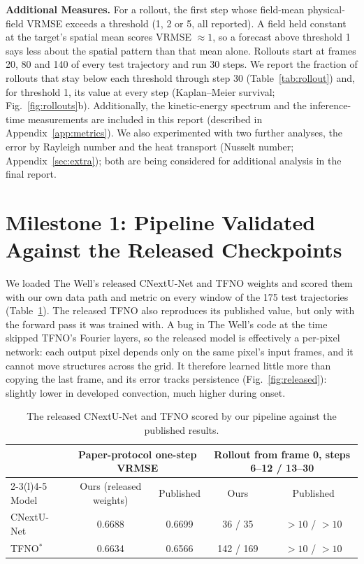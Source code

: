 \documentclass[11pt]{article}
\begin{document}
\textbf{Additional Measures.} For a rollout, the first step whose field-mean physical-field VRMSE exceeds a threshold
(1, 2 or 5, all reported). A field held constant at the target's spatial mean scores VRMSE $\approx 1$, so a
forecast above threshold 1 says less about the spatial pattern than that mean alone. Rollouts start at frames 20,
80 and 140 of every test trajectory and run 30 steps. We
report the fraction of rollouts that stay below each threshold through step 30 (Table~\ref{tab:rollout}) and,
for threshold 1, its value at every step (Kaplan--Meier survival; Fig.~\ref{fig:rollouts}b). Additionally, the kinetic-energy spectrum and the inference-time measurements are included in this report (described in Appendix~\ref{app:metrics}). We also
experimented with two further analyses, the error by Rayleigh number and the heat transport (Nusselt number;
Appendix~\ref{sec:extra}); both are being considered for additional analysis in the final report.


\section{Milestone 1: Pipeline Validated Against the Released Checkpoints}
\label{sec:m1}

We loaded The Well's released CNextU-Net and TFNO weights and scored them with our own data path and metric on
every window of the 175 test trajectories (Table~\ref{tab:released}). The released TFNO also reproduces its
published value, but only with the forward pass it was trained with. A bug in The Well's code at the time skipped
TFNO's Fourier layers, so the released model is effectively a per-pixel network: each output pixel depends only on
the same pixel's input frames, and it cannot move structures across the grid. It therefore learned little more
than copying the last frame, and its error tracks persistence (Fig.~\ref{fig:released}): slightly lower in
developed convection, much higher during onset.

\begin{table}[!htbp]
\centering\small
\begin{tabular}{@{}lcccc@{}}
\toprule
& \multicolumn{2}{c}{Paper-protocol one-step VRMSE} & \multicolumn{2}{c}{Rollout from frame 0, steps 6--12 / 13--30} \\
\cmidrule(lr){2-3}\cmidrule(l){4-5}
Model & Ours  (released weights) & Published & Ours & Published \\
\midrule
CNextU-Net & 0.6688 & 0.6699 & 36 / 35 & $>10$ / $>10$ \\
TFNO$^{*}$ & 0.6634 & 0.6566 & 142 / 169 & $>10$ / $>10$ \\
\bottomrule
\end{tabular}
\caption{The released CNextU-Net and TFNO scored by our pipeline against the published results.}
\label{tab:released}
\end{table}
\end{document}
